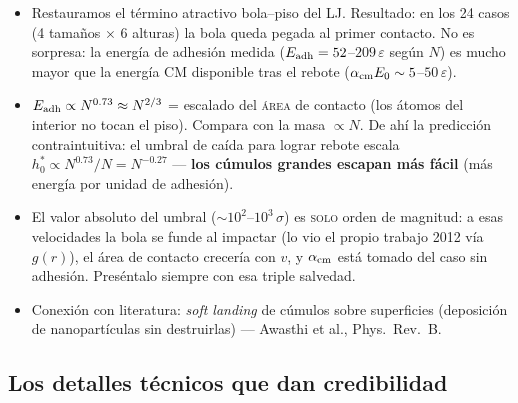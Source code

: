 \documentclass[11pt,a4paper]{article}
\newcommand{\eps}{\varepsilon}
\begin{document}
\begin{itemize}[leftmargin=1.4em]
    \item Restauramos el término atractivo bola--piso del LJ. Resultado:
    en los 24 casos (4 tamaños $\times$ 6 alturas) la bola queda pegada
    al primer contacto. No es sorpresa: la energía de adhesión medida
    ($E_{\rm adh}=52$--$209\,\eps$ según $N$) es mucho mayor que la
    energía CM disponible tras el rebote
    ($\alpha_{\rm cm}E_0\sim5$--$50\,\eps$).
    \item $E_{\rm adh}\propto N^{0.73}\approx N^{2/3}$ = escalado del
    \textsc{área} de contacto (los átomos del interior no tocan el piso).
    Compara con la masa $\propto N$. De ahí la predicción
    contraintuitiva: el umbral de caída para lograr rebote escala
    $h_0^*\propto N^{0.73}/N=N^{-0.27}$ --- \textbf{los cúmulos grandes
    escapan más fácil} (más energía por unidad de adhesión).
    \item El valor absoluto del umbral ($\sim10^2$--$10^3\,\sigma$) es
    \textsc{solo} orden de magnitud: a esas velocidades la bola se funde
    al impactar (lo vio el propio trabajo 2012 vía $g(r)$), el área de
    contacto crecería con $v$, y $\alpha_{\rm cm}$ está tomado del caso
    sin adhesión. Preséntalo siempre con esa triple salvedad.
    \item Conexión con literatura: \emph{soft landing} de cúmulos sobre
    superficies (deposición de nanopartículas sin destruirlas) ---
    Awasthi et al., Phys.\ Rev.\ B.
\end{itemize}

\subsection{Los detalles técnicos que dan credibilidad}
\label{sec:tecnicos}
\end{document}
